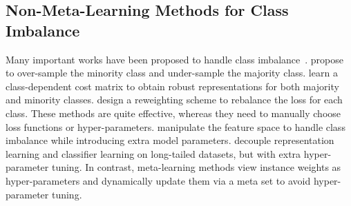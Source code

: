 \subsection{Non-Meta-Learning Methods for Class Imbalance}
%
Many important works have been proposed to handle class imbalance~\cite{elkanFoundationsCostsensitiveLearning2001,chawlaSMOTESyntheticMinority2002a,anandApproachClassificationHighly2010a,dongClassRectificationHard2017a,khanCostSensitiveLearningDeep2018,cuiClassBalancedLossBased2019,kangDecouplingRepresentationClassifier2019,linFocalLossDense2020,sinhaClassWiseDifficultyBalancedLoss2021a}.
%
\cite{chawlaSMOTESyntheticMinority2002a,anandApproachClassificationHighly2010a} propose to over-sample
the minority class and under-sample the majority class.
%
\cite{elkanFoundationsCostsensitiveLearning2001,khanCostSensitiveLearningDeep2018} learn a class-dependent cost matrix to obtain robust representations for both majority and minority classes.
%
\cite{dongClassRectificationHard2017a,cuiClassBalancedLossBased2019,linFocalLossDense2020,sinhaClassWiseDifficultyBalancedLoss2021a} design a
reweighting scheme to rebalance the loss for each class.
%
These methods are quite effective, whereas they need to manually choose loss functions or hyper-parameters.
%
\cite{liuLargeScaleLongTailedRecognition2019,wangLongtailedRecognitionRouting2020} manipulate the feature space to handle class imbalance while introducing extra model parameters.
%
\cite{kangDecouplingRepresentationClassifier2019} decouple representation learning and classifier learning on long-tailed datasets, but with extra hyper-parameter tuning.
%
In contrast, meta-learning methods view instance weights as hyper-parameters and dynamically update them via a meta set to avoid hyper-parameter tuning.

